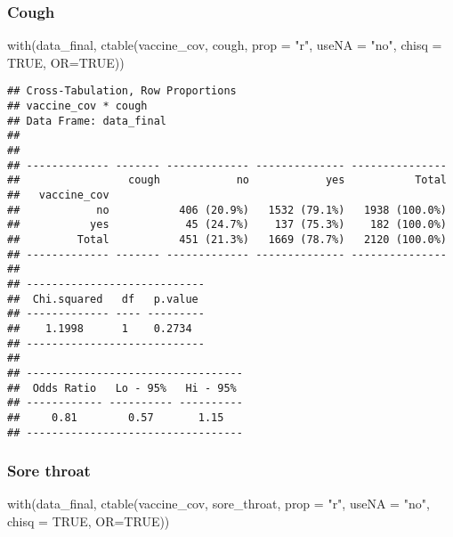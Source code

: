 \documentclass[
]{article}
\newenvironment{Shaded}{\begin{snugshade}}{\end{snugshade}}
\newcommand{\AttributeTok}[1]{\textcolor[rgb]{0.77,0.63,0.00}{#1}}
\newcommand{\ConstantTok}[1]{\textcolor[rgb]{0.00,0.00,0.00}{#1}}
\newcommand{\FunctionTok}[1]{\textcolor[rgb]{0.00,0.00,0.00}{#1}}
\newcommand{\NormalTok}[1]{#1}
\newcommand{\StringTok}[1]{\textcolor[rgb]{0.31,0.60,0.02}{#1}}
\begin{document}
\hypertarget{cough}{%
\subsubsection{Cough}\label{cough}}

\begin{Shaded}
\begin{Highlighting}[]
\FunctionTok{with}\NormalTok{(data\_final, }\FunctionTok{ctable}\NormalTok{(vaccine\_cov, cough, }\AttributeTok{prop =} \StringTok{"r"}\NormalTok{, }\AttributeTok{useNA =} \StringTok{"no"}\NormalTok{, }\AttributeTok{chisq =} \ConstantTok{TRUE}\NormalTok{, }\AttributeTok{OR=}\ConstantTok{TRUE}\NormalTok{))}
\end{Highlighting}
\end{Shaded}

\begin{verbatim}
## Cross-Tabulation, Row Proportions  
## vaccine_cov * cough  
## Data Frame: data_final  
## 
## 
## ------------- ------- ------------- -------------- ---------------
##                 cough            no            yes           Total
##   vaccine_cov                                                     
##            no           406 (20.9%)   1532 (79.1%)   1938 (100.0%)
##           yes            45 (24.7%)    137 (75.3%)    182 (100.0%)
##         Total           451 (21.3%)   1669 (78.7%)   2120 (100.0%)
## ------------- ------- ------------- -------------- ---------------
## 
## ----------------------------
##  Chi.squared   df   p.value 
## ------------- ---- ---------
##    1.1998      1    0.2734  
## ----------------------------
## 
## ----------------------------------
##  Odds Ratio   Lo - 95%   Hi - 95% 
## ------------ ---------- ----------
##     0.81        0.57       1.15   
## ----------------------------------
\end{verbatim}

\hypertarget{sore-throat}{%
\subsubsection{Sore throat}\label{sore-throat}}

\begin{Shaded}
\begin{Highlighting}[]
\FunctionTok{with}\NormalTok{(data\_final, }\FunctionTok{ctable}\NormalTok{(vaccine\_cov, sore\_throat, }\AttributeTok{prop =} \StringTok{"r"}\NormalTok{, }\AttributeTok{useNA =} \StringTok{"no"}\NormalTok{, }\AttributeTok{chisq =} \ConstantTok{TRUE}\NormalTok{, }\AttributeTok{OR=}\ConstantTok{TRUE}\NormalTok{))}
\end{Highlighting}
\end{Shaded}
\end{document}
